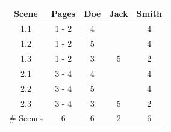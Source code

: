 \begin{landscape}
\begin{table}[H] %
\begin{tabular}{|c|c|c|c|c|}
\hline
Scene & Pages & Doe & Jack & Smith \\ \hline
  1.1 & 1 - 2 & \cellcolor{TableColorAppearance} 4 &                                  & \cellcolor{TableColorAppearance} 4 \\ \hline
  1.2 & 1 - 2 & \cellcolor{TableColorAppearance} 5 &                                  & \cellcolor{TableColorAppearance} 4 \\ \hline
  1.3 & 1 - 2 & \cellcolor{TableColorAppearance} 3 & \cellcolor{TableColorAppearance} 5 & \cellcolor{TableColorAppearance} 2 \\ \hline
  2.1 & 3 - 4 & \cellcolor{TableColorAppearance} 4 &                                  & \cellcolor{TableColorAppearance} 4 \\ \hline
  2.2 & 3 - 4 & \cellcolor{TableColorAppearance} 5 &                                  & \cellcolor{TableColorAppearance} 4 \\ \hline
  2.3 & 3 - 4 & \cellcolor{TableColorAppearance} 3 & \cellcolor{TableColorAppearance} 5 & \cellcolor{TableColorAppearance} 2 \\ \hline
\# Scenes & 6 & 6 & 2 & 6 \\ \hline

\end{tabular}
\end{table}
\end{landscape}
